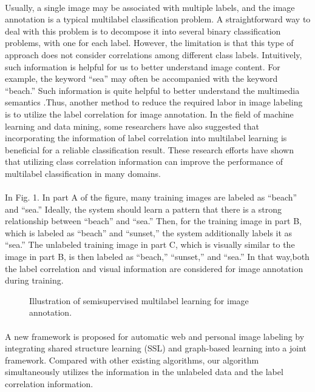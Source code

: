 \documentclass[a4paper,11pt]{report}
\begin{document}
\paragraph{}Usually, a single image may be associated with multiple labels,
and the image annotation is a typical multilabel classification
problem. A straightforward way to deal with this problem is
to decompose it into several binary classification problems, with
one for each label. However, the limitation is that this type of
approach does not consider correlations among different class
labels. Intuitively, such information is helpful for us to better
understand image content. For example, the keyword “sea” may
often be accompanied with the keyword “beach.” Such information
is quite helpful to better understand the multimedia semantics
.Thus, another method to reduce the required labor
in image labeling is to utilize the label correlation for image annotation.
In the field of machine learning and data mining, some
researchers have also suggested that incorporating the information
of label correlation into multilabel learning is beneficial for
a reliable classification result. These research efforts
have shown that utilizing class correlation information can improve
the performance of multilabel classification in many domains.
\paragraph{}In Fig. 1. In part A of the
figure, many training images are labeled as “beach” and “sea.”
Ideally, the system should learn a pattern that there is a strong
relationship between “beach” and “sea.” Then, for the training
image in part B, which is labeled as “beach” and “sunset,” the
system additionally labels it as “sea.” The unlabeled training
image in part C, which is visually similar to the image in part B, is then labeled as “beach,” “sunset,” and “sea.” In that way,both the label correlation and visual information are considered
for image annotation during training.
\begin{figure}
\begin{center}
\caption{Illustration of semisupervised multilabel learning for image annotation.}
\label{fig:butterfly}
\end{center}
\end{figure}
\paragraph{}A new framework is proposed for automatic
web and personal image labeling by integrating shared structure
learning (SSL) and graph-based learning into a joint framework.
Compared with other existing algorithms, our algorithm simultaneously
utilizes the information in the unlabeled data and the
label correlation information.
\end{document}
